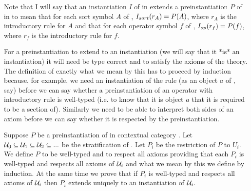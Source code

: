 Note that I will say that an instantiation $I$ of \gatUw in \catcw extends a preinstantiation $P$ of \gatUw in \catcw to mean that for each sort symbol $A$ of \gatU,
$I_{sort}(r_A) = P(A)$, where $r_A$ is the introductory rule for $A$ and that for each operator symbol
$f$ of \gatU,   $I_{op}(r_f) = P(f)$, where $r_f$ is the introductory rule for $f$.

\note
 For a preinstantiation to extend to an instantiation (we will say that it *is* an instantiation) 
it will need be type correct and to satisfy the axioms of the theory. The definition of exactly what we mean by this has to proceed by induction because, for example, we need an instantiation of the rule
 (as an object $a$ of \catc, say) before we can say whether a preinstantiation of an operator with introductory rule \genericfintroductoryrule
is well-typed (i.e. to know that it is object $a$ that it is required to be a section of).
Similarly we need to be able to interpret both sides of an axiom before we can say whether it is respected
by the preinstantiation. 

\note Suppose $P$ be a preinstantiation of \gatUw in contextual category \catc.
Let $\mathcal{U}_0 \subseteq \mathcal{U}_1 \subseteq \mathcal{U}_2 \subseteq ...$ be the stratification of \gatU. 
Let $P_i$ be the restriction of $P$ to $U_i$. 
We define $P$ to be well-typed and to respect all axioms 
providing that  each  $P_i$ is well-typed and respects all axioms of $\mathcal{U}_i$ and 
what we mean by this we define by induction. 
At the same time we prove that if $P_i$ is well-typed and respects all axioms of $\mathcal{U}_i$ then $P_i$
extends uniquely to an instantiation of $\mathcal{U}_i$.  

